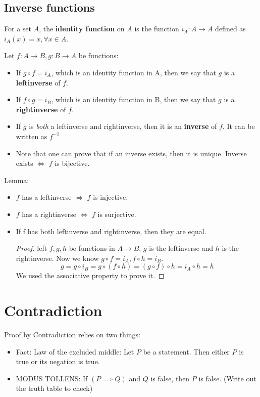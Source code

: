 \documentclass[letterpaper,12pt]{article}
\begin{document}
\subsection{Inverse functions}
For a set $A$, the \textbf{identity function} on $A$ is the function $i_A:A\to A$ defined as $i_A(x)=x,\forall x \in A$.  

Let $f:A\to B, g:B\to A$ be functions:
\begin{itemize}
    \item If $g\circ f=i_A$, which is an identity function in A, then we say that $g$ is a \textbf{left\-inverse} of $f$.
    \item If $f\circ g=i_B$, which is an identity function in B, then we say that $g$ is a \textbf{right\-inverse} of $f$.
    \item If $g$ is \textit{both} a left\-inverse and right\-inverse, then it is an \textbf{inverse} of $f$. It can be written as $f^{-1}$
    \item Note that one can prove that if an inverse exists, then it is unique. Inverse exists $\iff$ $f$ is bijective.
\end{itemize}
Lemma:
\begin{itemize}
    \item $f$ has a left\-inverse $\iff$ $f$ is injective.
    \item $f$ has a right\-inverse $\iff$ $f$ is surjective.
    \item If f has both left\-inverse and right\-inverse, then they are equal.\begin{proof}
        left $f,g,h$ be functions in $A\to B$, $g$ is the left\-inverse and $h$ is the right\-inverse. Now we know $g\circ f = i_A, f\circ h=i_B$.
        \[g=g\circ i_B=g\circ(f\circ h)=(g\circ f)\circ h=i_A\circ h =h\]
        We used the associative property to prove it. 
    \end{proof}
\end{itemize}

\section{Contradiction}
Proof by Contradiction relies on two things:
\begin{itemize}
    \item Fact: Law of the excluded middle: Let $P$ be a statement. Then either $P$ is true or its negation is true.
    \item MODUS TOLLENS: If $(P\implies Q)$ and $Q$ is false, then $P$ is false. (Write out the truth table to check)
\end{itemize}
\end{document}
